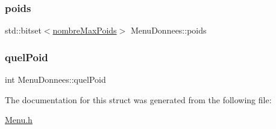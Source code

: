 \subsubsection{\texorpdfstring{poids}{poids}}
{\footnotesize\ttfamily std\+::bitset$<$\mbox{\hyperlink{libraries_8h_ad73c201205ac3bfe4a118d327a7255ce}{nombre\+Max\+Poids}}$>$ Menu\+Donnees\+::poids}

\mbox{\label{struct_menu_donnees_aa2561120ada24f21a281f888005f086e}} 
\subsubsection{\texorpdfstring{quelPoid}{quelPoid}}
{\footnotesize\ttfamily int Menu\+Donnees\+::quel\+Poid}



The documentation for this struct was generated from the following file\+:\begin{DoxyCompactItemize}
\item 
\mbox{\hyperlink{_menu_8h}{Menu.\+h}}\end{DoxyCompactItemize}
